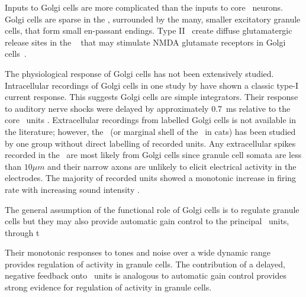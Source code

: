 


Inputs to Golgi cells are more complicated than the inputs to core
\VCN~neurons. Golgi cells are sparse in the \GCD, surrounded by the many,
smaller excitatory granule cells, that form small en-passant endings. Type II
\ANFs~create diffuse glutamatergic release sites in the
\GCD~\citep{HurdHutsonEtAl:1999,BensonBrown:2004} that may stimulate NMDA
glutamate receptors in Golgi cells~\citep{FerragamoGoldingEtAl:1998a}.

\smallskip{}

The physiological response of Golgi cells has not been extensively
studied. Intracellular recordings of Golgi cells in one study by
\citet{FerragamoGoldingEtAl:1998} have shown a classic type-I current
response. This suggests Golgi cells are simple integrators. Their response to
auditory nerve shocks were delayed by approximately 0.7~ms relative to the core
\VCN~units \citep{FerragamoGoldingEtAl:1998}. Extracellular recordings from
labelled Golgi cells is not available in the literature; however, the \GCD~(or
marginal shell of the \VCN~in cats) has been studied by one group
\citet{GhoshalKim:1997} without direct labelling of recorded units. Any
extracellular spikes recorded in the \GCD~are most likely from Golgi cells since
granule cell somata are less than $10 \mu{m}$ and their narrow axons are
unlikely to elicit electrical activity in the electrodes. The majority of
recorded units showed a monotonic increase in firing rate with increasing sound
intensity \citep[Figure~\ref{fig:GolgiKimFig2}][]{GhoshalKim:1997}.

The general assumption of the functional role of Golgi cells is to regulate
granule cells but they may also provide automatic gain control to the principal
\VCN~units, through t 

Their monotonic responses to tones and noise over a wide
dynamic range provides regulation of activity in granule cells.  The
contribution of a delayed, negative feedback onto \VCN~units is analogous to
automatic gain control provides strong evidence for regulation of activity in
granule cells.

